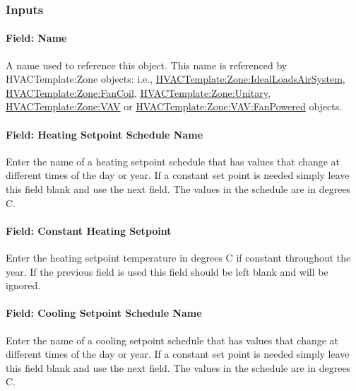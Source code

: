 \subsubsection{Inputs}\label{inputs-024}

\paragraph{Field: Name}\label{field-name-023}

A name used to reference this object. This name is referenced by HVACTemplate:Zone objects: i.e., \hyperref[hvactemplatezoneidealloadsairsystem]{HVACTemplate:Zone:IdealLoadsAirSystem}, \hyperref[hvactemplatezonefancoil]{HVACTemplate:Zone:FanCoil}, \hyperref[hvactemplatezoneunitary]{HVACTemplate:Zone:Unitary}, \hyperref[hvactemplatezonevav]{HVACTemplate:Zone:VAV} or \hyperref[hvactemplatezonevavfanpowered]{HVACTemplate:Zone:VAV:FanPowered} objects.

\paragraph{Field: Heating Setpoint Schedule Name}\label{field-heating-setpoint-schedule-name}

Enter the name of a heating setpoint schedule that has values that change at different times of the day or year. If a constant set point is needed simply leave this field blank and use the next field. The values in the schedule are in degrees C.

\paragraph{Field: Constant Heating Setpoint}\label{field-constant-heating-setpoint}

Enter the heating setpoint temperature in degrees C if constant throughout the year. If the previous field is used this field should be left blank and will be ignored.

\paragraph{Field: Cooling Setpoint Schedule Name}\label{field-cooling-setpoint-schedule-name}

Enter the name of a cooling setpoint schedule that has values that change at different times of the day or year. If a constant set point is needed simply leave this field blank and use the next field. The values in the schedule are in degrees C.

